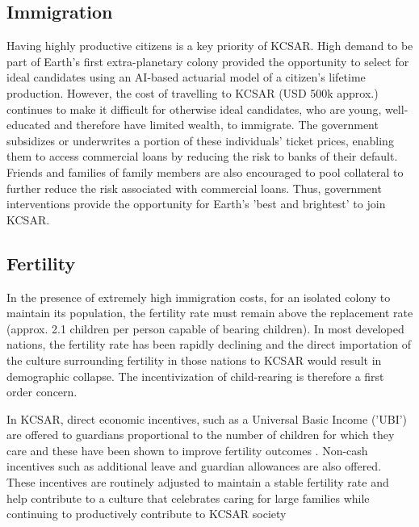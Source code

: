\documentclass[fleqn,10pt]{Stylesheet} %
\begin{document}
\subsection{Immigration}
Having highly productive citizens is a key priority of KCSAR. High demand to be part of Earth's first extra-planetary colony provided the opportunity to select for ideal candidates using an AI-based actuarial model of a citizen's lifetime production. However, the cost of travelling to KCSAR (USD 500k approx.) continues to make it difficult for otherwise ideal candidates, who are young, well-educated and therefore have limited wealth, to immigrate. The government subsidizes or underwrites a portion of these individuals' ticket prices, enabling them to access commercial loans by reducing the risk to banks of their default. Friends and families of family members are also encouraged to pool collateral to further reduce the risk associated with commercial loans. Thus, government interventions provide the opportunity for Earth's 'best and brightest' to join KCSAR.

\subsection{Fertility}
In the presence of extremely high immigration costs, for an isolated colony to maintain its population, the fertility rate must remain above the replacement rate (approx. 2.1 children per person capable of bearing children). In most developed nations, the fertility rate has been rapidly declining and the direct importation of the culture surrounding fertility in those nations to KCSAR would result in demographic collapse. The incentivization of child-rearing is therefore a first order concern.

In KCSAR, direct economic incentives, such as a Universal Basic Income ('UBI') are offered to guardians proportional to the number of children for which they care and these have been shown to improve fertility outcomes \cite{Kalwij} \cite{Bjorklund}. Non-cash incentives such as additional leave and guardian allowances are also offered. These incentives are routinely adjusted to maintain a stable fertility rate and help contribute to a culture that celebrates caring for large families while continuing to productively contribute to KCSAR society 
        
\end{document}
